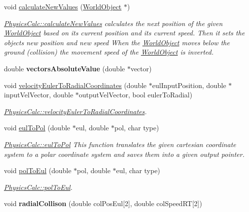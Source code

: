 \begin{DoxyCompactItemize}
\item 
void \hyperlink{class_physics_calc_a8d6de304c47a3b6be6fdfd7bacd3dcd2}{calculate\+New\+Values} (\hyperlink{class_world_object}{World\+Object} $\ast$)
\begin{DoxyCompactList}\small\item\em \hyperlink{class_physics_calc_a8d6de304c47a3b6be6fdfd7bacd3dcd2}{Physics\+Calc\+::calculate\+New\+Values} calculates the next position of the given \hyperlink{class_world_object}{World\+Object} based on it\textquotesingle{}s current position and its current speed. Then it sets the object\textquotesingle{}s new position and new speed When the \hyperlink{class_world_object}{World\+Object} moves below the ground (collision) the movement speed of the \hyperlink{class_world_object}{World\+Object} is inverted. \end{DoxyCompactList}\item 
double {\bfseries vectors\+Absolute\+Value} (double $\ast$vector)\hypertarget{class_physics_calc_a5915904f1743c3a6cca6cf2b72a8d6f5}{}\label{class_physics_calc_a5915904f1743c3a6cca6cf2b72a8d6f5}

\item 
void \hyperlink{class_physics_calc_aae5264bd415c1cccac4bd4628cb015a0}{velocity\+Euler\+To\+Radial\+Coordinates} (double $\ast$eul\+Input\+Position, double $\ast$input\+Vel\+Vector, double $\ast$output\+Vel\+Vector, bool euler\+To\+Radial)
\begin{DoxyCompactList}\small\item\em \hyperlink{class_physics_calc_aae5264bd415c1cccac4bd4628cb015a0}{Physics\+Calc\+::velocity\+Euler\+To\+Radial\+Coordinates}. \end{DoxyCompactList}\item 
void \hyperlink{class_physics_calc_af038d3a5fe0160410456b14601a95581}{eul\+To\+Pol} (double $\ast$eul, double $\ast$pol, char type)
\begin{DoxyCompactList}\small\item\em \hyperlink{class_physics_calc_af038d3a5fe0160410456b14601a95581}{Physics\+Calc\+::eul\+To\+Pol} This function translates the given cartesian coordinate system to a polar coordinate system and saves them into a given output pointer. \end{DoxyCompactList}\item 
void \hyperlink{class_physics_calc_a441c3e94fe0e6eed1d96531368f50d54}{pol\+To\+Eul} (double $\ast$pol, double $\ast$eul, char type)
\begin{DoxyCompactList}\small\item\em \hyperlink{class_physics_calc_a441c3e94fe0e6eed1d96531368f50d54}{Physics\+Calc\+::pol\+To\+Eul}. \end{DoxyCompactList}\item 
void {\bfseries radial\+Collison} (double col\+Pos\+Eul\mbox{[}2\mbox{]}, double col\+Speed\+RT\mbox{[}2\mbox{]})\hypertarget{class_physics_calc_a2eabcd0d018806138c1141feedb13589}{}\label{class_physics_calc_a2eabcd0d018806138c1141feedb13589}


\end{DoxyCompactItemize}
